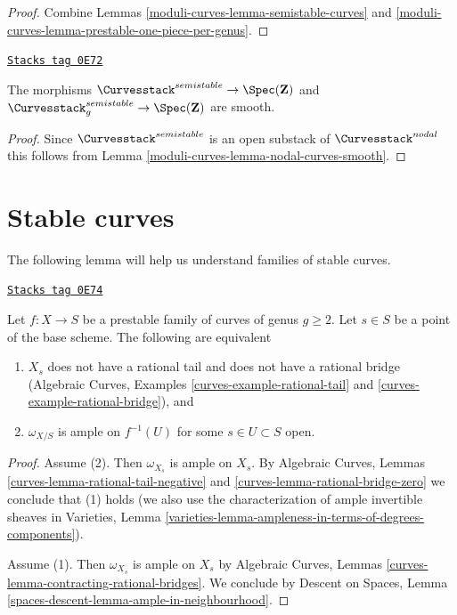 \begin{proof}
Combine Lemmas \ref{moduli-curves-lemma-semistable-curves} and
\ref{moduli-curves-lemma-prestable-one-piece-per-genus}.
\end{proof}

\begin{lemma}
\label{moduli-curves-lemma-semistable-curves-smooth}
\href{https://stacks.math.columbia.edu/tag/0E72}{\texttt{Stacks tag 0E72}}

The morphisms
$\Curvesstack^{semistable} \to \Spec(\mathbf{Z})$ and
$\Curvesstack^{semistable}_g \to \Spec(\mathbf{Z})$
are smooth.
\end{lemma}

\begin{proof}
Since $\Curvesstack^{semistable}$ is an open substack of
$\Curvesstack^{nodal}$ this follows from
Lemma \ref{moduli-curves-lemma-nodal-curves-smooth}.
\end{proof}

\section{Stable curves}
\label{moduli-curves-section-stable-curves}
The following lemma will help us understand families of stable curves.

\begin{lemma}[Stable]
\label{moduli-curves-lemma-stable}
\href{https://stacks.math.columbia.edu/tag/0E74}{\texttt{Stacks tag 0E74}}

Let $f : X \to S$ be a prestable family of curves of genus $g \geq 2$.
Let $s \in S$ be a point of the base scheme.
The following are equivalent
\begin{enumerate}
\item $X_s$ does not have a rational tail and does not have a
rational bridge
(Algebraic Curves, Examples
\ref{curves-example-rational-tail} and
\ref{curves-example-rational-bridge}), and
\item $\omega_{X/S}$ is ample on $f^{-1}(U)$ for some $s \in U \subset S$ open.
\end{enumerate}
\end{lemma}

\begin{proof}
Assume (2). Then $\omega_{X_s}$ is ample on $X_s$.
By Algebraic Curves, Lemmas \ref{curves-lemma-rational-tail-negative} and
\ref{curves-lemma-rational-bridge-zero}
we conclude that (1) holds (we also
use the characterization of ample invertible sheaves
in Varieties, Lemma
\ref{varieties-lemma-ampleness-in-terms-of-degrees-components}).

\medskip\noindent
Assume (1). Then $\omega_{X_s}$ is ample on $X_s$ by
Algebraic Curves, Lemmas \ref{curves-lemma-contracting-rational-bridges}.
We conclude by Descent on Spaces, Lemma
\ref{spaces-descent-lemma-ample-in-neighbourhood}.
\end{proof}

